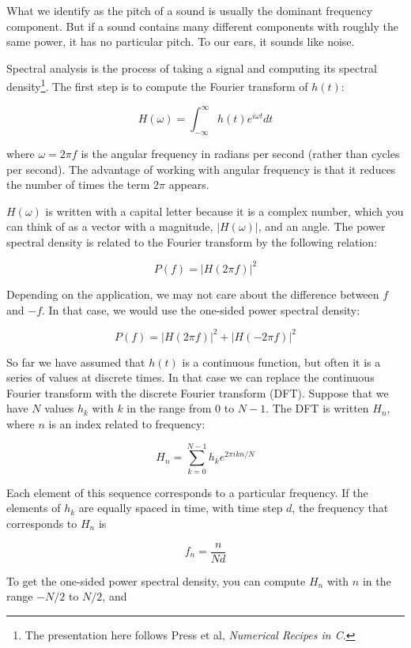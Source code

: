 \documentclass[10pt]{book}
\begin{document}
What we identify as the pitch of a sound is usually the dominant
frequency component.  But if a sound contains many different
components with roughly the same power, it has no particular pitch.
To our ears, it sounds like noise.

Spectral analysis is the process of taking a signal and computing its
spectral density\footnote{The presentation here follows Press et al,
  {\em Numerical Recipes in C}.}.  The first step is to compute the
  Fourier transform of $h(t)$:

\[ H(\omega) = \int_{-\infty}^{\infty} h(t) e^{i \omega t} dt \]

where $\omega = 2 \pi f$ is the angular frequency in
radians per second (rather than cycles per second).  The advantage
of working with angular frequency is that it reduces the number
of times the term $2 \pi$ appears.

$H(\omega)$ is written with a capital letter because it is a complex
number, which you can think of as a vector with a magnitude,
$|H(\omega)|$, and an angle.  The power spectral density is related to
the Fourier transform by the following relation:

\[ P(f) = |H(2 \pi f)|^2 \]

Depending on the application, we may not care about the difference
between $f$ and $-f$.  In that case, we would use the one-sided
power spectral density:

\[ P(f) = |H(2 \pi f)|^2 + |H(-2 \pi f)|^2 \]

So far we have assumed that $h(t)$ is a continuous function, but
often it is a series of values at discrete times.  In that
case we can replace the continuous Fourier transform with
the discrete Fourier transform (DFT).  Suppose that we have
$N$ values $h_k$ with $k$ in the range from 0 to $N-1$.  The
DFT is written $H_n$, where $n$ is an index related to frequency:

\begin{equation}
\label{dft}
H_n = \sum_{k=0}^{N-1} h_k e^{2 \pi i k n / N}
\end{equation}


Each element of this sequence corresponds to a particular frequency.
If the elements of $h_k$ are equally spaced in time, with time
step $d$, the frequency that corresponds to $H_n$ is

\[ f_n = \frac{n}{N d} \]

To get the one-sided power spectral density, you can compute $H_n$
with $n$ in the range $-N/2$ to $N/2$, and
\end{document}
